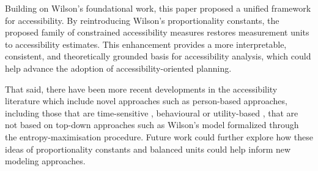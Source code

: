 \documentclass[
  10pt,
  letterpaper,
]{article}
\begin{document}
Building on Wilson's \citep{wilson1971} foundational work, this paper
proposed a unified framework for accessibility. By reintroducing
Wilson's proportionality constants, the proposed family of constrained
accessibility measures restores measurement units to accessibility
estimates. This enhancement provides a more interpretable, consistent,
and theoretically grounded basis for accessibility analysis, which could
help advance the adoption of accessibility-oriented planning.

That said, there have been more recent developments in the accessibility
literature which include novel approaches such as person-based
approaches, including those that are time-sensitive
\citep{yang2024evaluating, braga2023evaluating}, behavioural
\citep{kar2024inclusive, lu2014effects} or utility-based
\citep{guzman2023much, ben1985discrete}, that are not based on top-down
approaches such as Wilson's model formalized through the
entropy-maximisation procedure. Future work could further explore how
these ideas of proportionality constants and balanced units could help
inform new modeling approaches.


\nolinenumbers
  
\end{document}
